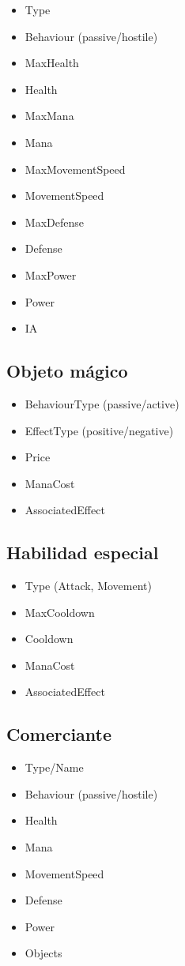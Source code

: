 \begin{itemize}
    \item Type
    \item Behaviour (passive/hostile)
    \item MaxHealth
    \item Health
    \item MaxMana
    \item Mana
    \item MaxMovementSpeed
    \item MovementSpeed
    \item MaxDefense
    \item Defense
    \item MaxPower
    \item Power
    \item IA
\end{itemize}

\subsection{Objeto mágico}
\begin{itemize}
    \item BehaviourType (passive/active)
    \item EffectType (positive/negative)
    \item Price
    \item ManaCost
    \item AssociatedEffect
\end{itemize}

\subsection{Habilidad especial}
\begin{itemize}
    \item Type (Attack, Movement)
    \item MaxCooldown
    \item Cooldown
    \item ManaCost
    \item AssociatedEffect
\end{itemize}

\subsection{Comerciante}
\begin{itemize}
    \item Type/Name
    \item Behaviour (passive/hostile)
    \item Health
    \item Mana
    \item MovementSpeed
    \item Defense
    \item Power
    \item Objects
\end{itemize}